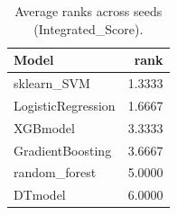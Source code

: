 \begin{table}[t]
\centering
\begin{tabular}{lr}
\toprule
Model & rank \\
\midrule
sklearn_SVM & 1.3333 \\
LogisticRegression & 1.6667 \\
XGBmodel & 3.3333 \\
GradientBoosting & 3.6667 \\
random_forest & 5.0000 \\
DTmodel & 6.0000 \\
\bottomrule
\end{tabular}
\caption{Average ranks across seeds (Integrated_Score).}
\label{tab:avg_rank_Integrated_Score}
\end{table}